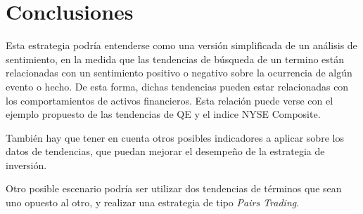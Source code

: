 \documentclass[a4paper, 11pt, twocolumn]{article}
\begin{document}
\section{Conclusiones}
Esta estrategia podría entenderse como una versión simplificada de un análisis de sentimiento, en la medida que las tendencias de búsqueda de un termino están relacionadas con un sentimiento positivo o negativo sobre la ocurrencia de algún evento o hecho. De esta forma, dichas tendencias pueden estar relacionadas con los comportamientos de activos financieros. Esta relación puede verse con el ejemplo propuesto de las tendencias de QE y el indice NYSE Composite.

También hay que tener en cuenta otros posibles indicadores a aplicar sobre los datos de tendencias, que puedan mejorar el desempeño de la estrategia de inversión.

Otro posible escenario podría ser utilizar dos tendencias de términos que sean uno opuesto al otro, y realizar una estrategia de tipo \textit{Pairs Trading}.
\end{document}
